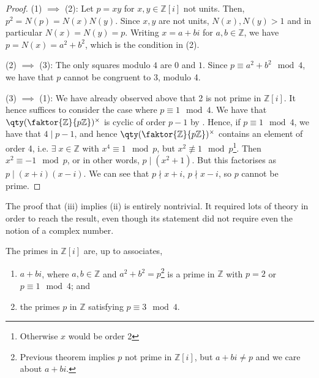 \begin{proof}
	(1) $\implies$ (2): Let $p = xy$ for $x, y \in \mathbb Z[i]$ not units.
	Then, $p^2 = N(p) = N(x)N(y)$.
	Since $x, y$ are not units, $N(x), N(y) > 1$ and in particular $N(x) = N(y) = p$.
	Writing $x = a+bi$ for $a, b \in \mathbb Z$, we have $p = N(x) = a^2 + b^2$, which is the condition in (2).

	(2) $\implies$ (3): The only squares modulo $4$ are $0$ and $1$.
	Since $p \equiv a^2 + b^2 \mod 4$, we have that $p$ cannot be congruent to 3, modulo 4.

	(3) $\implies$ (1): We have already observed above that 2 is not prime in $\mathbb{Z}[i]$.
	It hence suffices to consider the case where $p \equiv 1 \mod 4$.
	We have that $\qty(\faktor{\mathbb Z}{p\mathbb Z})^\times$ is cyclic of order $p-1$ by .
	Hence, if $p \equiv 1 \mod 4$, we have that $4 \mid p-1$, and hence $\qty(\faktor{\mathbb Z}{p\mathbb Z})^\times$ contains an element of order 4, i.e. $\exists \; x \in \mathbb Z$ with $x^4 \equiv 1 \mod p$, but $x^2 \not\equiv 1 \mod p$\footnote{Otherwise $x$ would be order 2}.
	Then $x^2 \equiv -1 \mod p$, or in other words, $p \mid (x^2 + 1)$.
	But this factorises as $p \mid (x+i)(x-i)$.
	We can see that $p \nmid x+i$, $p \nmid x-i$, so $p$ cannot be prime.
\end{proof}

\begin{remark}
	The proof that (iii) implies (ii) is entirely nontrivial.
	It required lots of theory in order to reach the result, even though its statement did not require even the notion of a complex number.
\end{remark}

\begin{theorem} \label{thm:12.2}
	The primes in $\mathbb Z[i]$ are, up to associates,
	\begin{enumerate}
		\item $a + bi$, where $a, b \in \mathbb Z$ and $a^2 + b^2 = p$\footnote{Previous theorem implies $p$ not prime in $\mathbb{Z}[i]$, but $a + bi \neq p$ and we care about $a + bi$.} is a prime in $\mathbb Z$ with $p = 2$ or $p \equiv 1 \mod 4$; and
		\item the primes $p$ in $\mathbb Z$ satisfying $p \equiv 3 \mod 4$.
	\end{enumerate}
\end{theorem}

